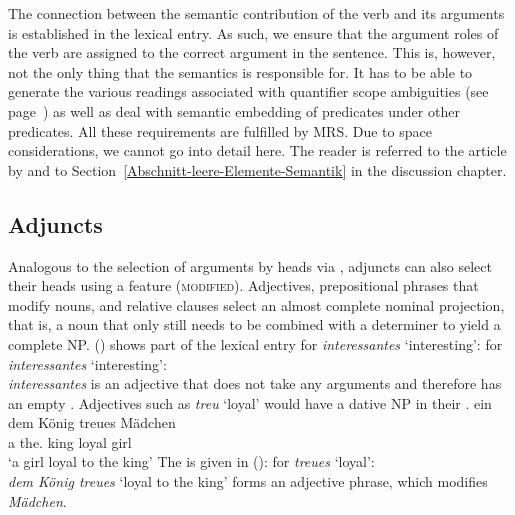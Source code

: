 The connection between the semantic contribution of the verb and its arguments is established in the lexical entry.
As such, we ensure that the argument roles of the verb are assigned to the correct argument in the sentence. This is, however, not the only
thing that the semantics is responsible for. It has to be able to generate the various readings associated with quantifier scope ambiguities 
(see page~\pageref{Beispiel-Every-man-loves-a-woman}) as well as deal with semantic embedding of predicates under other predicates. All these
requirements are fulfilled by MRS. Due to space considerations, we cannot go into detail here. The reader is referred to the article by
\citet*{CFPS2005a} and to Section~\ref{Abschnitt-leere-Elemente-Semantik} in the discussion chapter.



\subsection{Adjuncts}
\label{Abschnitt-HPSG-Adjunkte}\label{sec-adjuncts-hpsg}

Analogous to the selection of arguments by heads via \subcat, adjuncts can also select their heads using a feature (\textsc{modified}).
Adjectives, prepositional phrases that modify nouns, and relative clauses select an almost complete nominal projection, that is, a noun that only still needs to
be combined with a determiner to yield a complete NP. () shows part of the lexical entry for \emph{interessantes} `interesting':
\eas{}
\label{le-interessantes}
\catv for \emph{interessantes} `interesting':\\
\zs
\emph{interessantes} is an adjective that does not take any arguments and therefore has an empty \subcatl. Adjectives such as \emph{treu} `loyal' would
have a dative NP in their \subcatl.
\ea
\gll ein dem König treues Mädchen\\
	a the.\dat{} king loyal girl\\
\glt `a girl loyal to the king'
\z
The \catv is given in ():
\ea
\label{le-treue}
\catv for \emph{treues} `loyal':\\
\z
\emph{dem König treues} `loyal to the king' forms an adjective phrase, which modifies \emph{Mädchen}.


